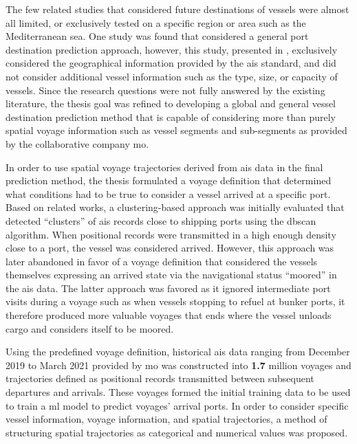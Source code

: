 The few related studies that considered future destinations of vessels were almost all limited, or exclusively tested on a specific region or area such as the Mediterranean sea. One study was found that considered a general port destination prediction approach, however, this study, presented in \cite{Zhang2020AISApproach}, exclusively considered the geographical information provided by the \acrshort{ais} standard, and did not consider additional vessel information such as the type, size, or capacity of vessels. Since the research questions were not fully answered by the existing literature, the thesis goal was refined to developing a global and general vessel destination prediction method that is capable of considering more than purely spatial voyage information such as vessel segments and sub-segments as provided by the collaborative company \acrfull{mo}.

In order to use spatial voyage trajectories derived from \acrshort{ais} data in the final prediction method, the thesis formulated a voyage definition that determined what conditions had to be true to consider a vessel arrived at a specific port. Based on related works, a clustering-based approach was initially evaluated that detected ``clusters'' of \acrshort{ais} records close to shipping ports using the \acrfull{dbscan} algorithm. When positional records were transmitted in a high enough density close to a port, the vessel was considered arrived. However, this approach was later abandoned in favor of a voyage definition that considered the vessels themselves expressing an arrived state via the navigational status ``moored'' in the \acrshort{ais} data. The latter approach was favored as it ignored intermediate port visits during a voyage such as when vessels stopping to refuel at bunker ports, it therefore produced more valuable voyages that ends where the vessel unloads cargo and considers itself to be moored.

Using the predefined voyage definition, historical \acrshort{ais} data ranging from December 2019 to March 2021 provided by \acrshort{mo} was constructed into \textbf{1.7} million voyages and trajectories defined as positional records transmitted between subsequent departures and arrivals. These voyages formed the initial training data to be used to train a \acrfull{ml} model to predict voyages' arrival ports. In order to consider specific vessel information, voyage information, and spatial trajectories, a method of structuring spatial trajectories as categorical and numerical values was proposed.

